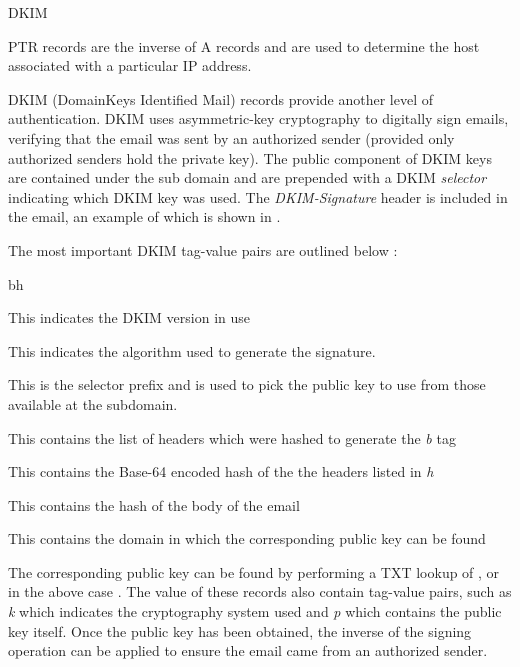 \begin{labeling}{DKIM }
  \item[PTR] PTR records are the inverse of A records and are used to determine the host associated with a particular IP address. 
  \item[DKIM] DKIM (DomainKeys Identified Mail) records provide another level of authentication. DKIM uses asymmetric-key cryptography to digitally sign emails, verifying that the email was sent by an authorized sender (provided only authorized senders hold the private key). The public component of DKIM keys are contained under the  sub domain and are prepended with a DKIM \textit{selector} indicating which DKIM key was used. The \textit{DKIM-Signature} header is included in the email, an example of which is shown in .
  

  The most important DKIM tag-value pairs are outlined below \cite{dkimSig}:
  \begin{labeling}{bh }
    \item[v] This indicates the DKIM version in use
    \item[a] This indicates the algorithm used to generate the signature.
    \item[s] This is the selector prefix and is used to pick the public key to use from those available at the  subdomain.
    \item[h] This contains the list of headers which were hashed to generate the \textit{b} tag
    \item[b] This contains the Base-64 encoded hash of the the headers listed in \textit{h}
    \item[bh] This contains the hash of the body of the email
    \item[d] This contains the domain in which the corresponding public key can be found
  \end{labeling}

  The corresponding public key can be found by performing a TXT lookup of , or in the above case . The value of these records also contain tag-value pairs, such as \textit{k} which indicates the cryptography system used and \textit{p} which contains the public key itself. Once the public key has been obtained, the inverse of the signing operation can be applied to ensure the email came from an authorized sender.
\end{labeling}


